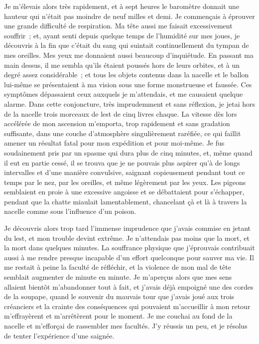 \documentclass[french,twoside]{book} %
\begin{document}
Je m’élevais alors très rapidement, et à sept heures le baromètre donnait une hauteur qui n’était pas moindre de neuf milles et demi. Je commençais à éprouver une grande difficulté de respiration. Ma tête aussi me faisait excessivement souffrir ; et, ayant senti depuis quelque temps de l’humidité sur mes joues, je découvris à la fin que c’était du sang qui suintait continuellement du tympan de mes oreilles. Mes yeux me donnaient aussi beaucoup d’inquiétude. En passant ma main dessus, il me sembla qu’ils étaient poussés hors de leurs orbites, et à un degré assez considérable ; et tous les objets contenus dans la nacelle et le ballon lui-même se présentaient à ma vision sous une forme monstrueuse et faussée. Ces symptômes dépassaient ceux auxquels je m’attendais, et me causaient quelque alarme. Dans cette conjoncture, très imprudemment et sans réflexion, je jetai hors de la nacelle trois morceaux de lest de cinq livres chaque. La vitesse dès lors accélérée de mon ascension m’emporta, trop rapidement et sans gradation suffisante, dans une couche d’atmosphère singulièrement raréfiée, ce qui faillit amener un résultat fatal pour mon expédition et pour moi-même. Je fus soudainement pris par un spasme qui dura plus de cinq minutes, et, même quand il eut en partie cessé, il se trouva que je ne pouvais plus aspirer qu’à de longs intervalles et d’une manière convulsive, saignant copieusement pendant tout ce temps par le nez, par les oreilles, et même légèrement par les yeux. Les pigeons semblaient en proie à une excessive angoisse et se débattaient pour s’échapper, pendant que la chatte miaulait lamentablement, chancelant çà et là à travers la nacelle comme sous l’influence d’un poison.\par
Je découvris alors trop tard l’immense imprudence que j’avais commise en jetant du lest, et mon trouble devint extrême. Je n’attendais pas moins que la mort, et la mort dans quelques minutes. La souffrance physique que j’éprouvais contribuait aussi à me rendre presque incapable d’un effort quelconque pour sauver ma vie. Il me restait à peine la faculté de réfléchir, et la violence de mon mal de tête semblait augmenter de minute en minute. Je m’aperçus alors que mes sens allaient bientôt m’abandonner tout à fait, et j’avais déjà empoigné une des cordes de la soupape, quand le souvenir du mauvais tour que j’avais joué aux trois créanciers et la crainte des conséquences qui pouvaient m’accueillir à mon retour m’effrayèrent et m’arrêtèrent pour le moment. Je me couchai au fond de la nacelle et m’efforçai de rassembler mes facultés. J’y réussis un peu, et je résolus de tenter l’expérience d’une saignée.\par
\end{document}
